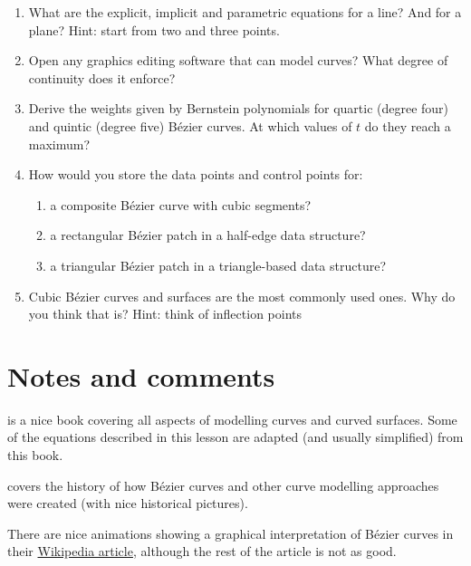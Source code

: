 \begin{enumerate}
	\item What are the explicit, implicit and parametric equations for a line? And for a plane? Hint: start from two and three points.
	\item Open any graphics editing software that can model curves? What degree of continuity does it enforce?
	\item Derive the weights given by Bernstein polynomials for quartic (degree four) and quintic (degree five) B\'ezier curves. At which values of \(t\) do they reach a maximum?
	\item How would you store the data points and control points for:
	\begin{enumerate}
		\item a composite B\'ezier curve with cubic segments?
		\item a rectangular B\'ezier patch in a half-edge data structure?
		\item a triangular B\'ezier patch in a triangle-based data structure?
	\end{enumerate}
	\item Cubic B\'ezier curves and surfaces are the most commonly used ones. Why do you think that is? Hint: think of inflection points
\end{enumerate}



%
\section{Notes and comments}

\citet{Salomon06} is a nice book covering all aspects of modelling curves and curved surfaces.
Some of the equations described in this lesson are adapted (and usually simplified) from this book.

\citet{Farin04} covers the history of how B\'ezier curves and other curve modelling approaches were created (with nice historical pictures).

There are nice animations showing a graphical interpretation of B\'ezier curves in their \href{https://en.wikipedia.org/wiki/Bézier_curve#Constructing_Bézier_curves}{Wikipedia article}, although the rest of the article is not as good.







